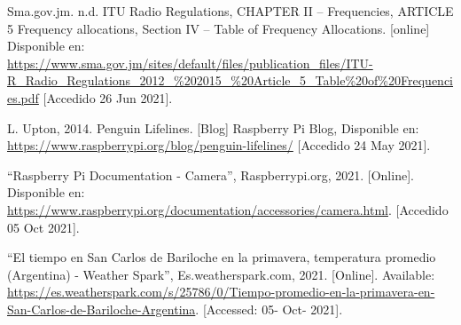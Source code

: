 \begin{flushleft}
\begin{thebibliography}{9}
Sma.gov.jm. n.d. ITU Radio Regulations, CHAPTER II – Frequencies, ARTICLE 5 Frequency allocations, Section IV – Table of Frequency Allocations. [online] Disponible en: \href{https://www.sma.gov.jm/sites/default/files/publication_files/ITU-R_Radio_Regulations_2012_\%202015_\%20Article_5_Table\%20of\%20Frequencies.pdf}{https://www.sma.gov.jm/sites/default/files/publication\_files/ITU-R\_Radio\_Regulations\_2012\_\%202015\_\%20Article\_5\_Table\%20of\%20Frequencies.pdf} [Accedido 26 Jun 2021].

L. Upton, 2014. Penguin Lifelines. [Blog] Raspberry Pi Blog, Disponible en: \href{https://www.raspberrypi.org/blog/penguin-lifelines/}{https://www.raspberrypi.org/blog/penguin-lifelines/} [Accedido 24 May 2021].


``Raspberry Pi Documentation - Camera'', Raspberrypi.org, 2021. [Online]. Disponible en: \href{https://www.raspberrypi.org/documentation/accessories/camera.html}{https://www.raspberrypi.org/documentation/accessories/camera.html}. [Accedido 05  Oct 2021].

``El tiempo en San Carlos de Bariloche en la primavera, temperatura promedio (Argentina) - Weather Spark'', Es.weatherspark.com, 2021. [Online]. Available: \href{https://es.weatherspark.com/s/25786/0/Tiempo-promedio-en-la-primavera-en-San-Carlos-de-Bariloche-Argentina}{https://es.weatherspark.com/s/25786/0/Tiempo-promedio-en-la-primavera-en-San-Carlos-de-Bariloche-Argentina}. [Accessed: 05- Oct- 2021].
\end{thebibliography}
\end{flushleft}

%
